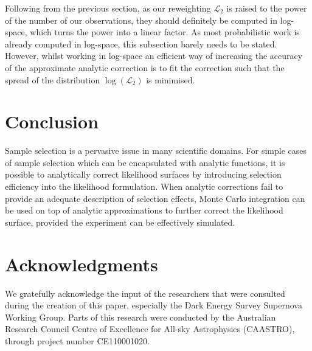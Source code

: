 \documentclass[a4paper,fleqn,usenatbib]{mnras}
\begin{document}
Following from the previous section, as our reweighting $\mathcal{L}_2$ is raised to the power of the number of our observations, they should definitely be computed in log-space, which turns the power into a linear factor. As most probabilistic work is already computed in log-space, this subsection barely needs to be stated. However, whilst working in log-space an efficient way of increasing the accuracy of the approximate analytic correction is to fit the correction such that the spread of the distribution $\log\left(\mathcal{L}_2\right)$ is minimised. 














\section{Conclusion}
\label{sec:conclusion}


Sample selection is a pervasive issue in many scientific domains. For simple cases of sample selection which can be encapsulated with analytic functions, it is possible to analytically correct likelihood surfaces by introducing selection efficiency into the likelihood formulation. When analytic corrections fail to provide an adequate description of selection effects, Monte Carlo integration can be used on top of analytic approximations to further correct the likelihood surface, provided the experiment can be effectively simulated. 



\section*{Acknowledgments}

We gratefully acknowledge the input of the researchers that were consulted during the creation of this paper, especially the Dark Energy Survey Supernova Working Group. Parts of this research were conducted by the Australian Research Council Centre of Excellence for All-sky Astrophysics (CAASTRO), through project number CE110001020.




\bsp	%
\label{lastpage}
\end{document}
